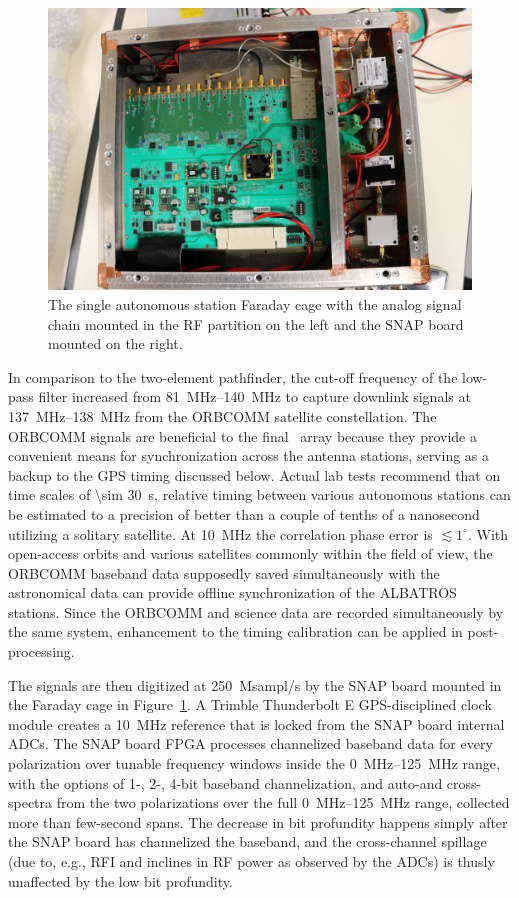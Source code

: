 \begin{figure}
	\centering
	\includegraphics[width=\linewidth]{Figures/47882594521_3895effd86_o}
	\caption{The single autonomous station Faraday cage with the analog signal chain mounted in the RF partition on the left and the SNAP board mounted on the right.}
	\label{fig:47882594521_3895effd86_o}
\end{figure}


In comparison to the two-element pathfinder, the cut-off frequency of the low-pass filter increased from \SIrange{81}{140}{\mega\hertz} to capture downlink signals at \SIrange{137}{138}{\mega\hertz} from the ORBCOMM satellite constellation. The ORBCOMM signals are beneficial to the final \albatros\ array because they provide a convenient means for synchronization across the antenna stations, serving as a backup to the GPS timing discussed below. Actual lab tests recommend that on time scales of \SI{\sim 30}{\second}, relative timing between various autonomous stations can be estimated to a precision of better than a couple of tenths of a nanosecond utilizing a solitary satellite. At \SI{10}{\mega\hertz} the correlation phase error is $\lesssim1^\circ$. With open-access orbits and various satellites commonly within the field of view, the ORBCOMM baseband data supposedly saved simultaneously with the astronomical data can provide offline synchronization of the ALBATROS stations. Since the ORBCOMM and science data are recorded simultaneously by the same system, enhancement to the timing calibration can be applied in post-processing.

The signals are then digitized at \SI{250}{Msampl/s} by the SNAP board mounted in the Faraday cage in Figure~\ref{fig:47882594521_3895effd86_o}. A Trimble Thunderbolt E GPS-disciplined clock module creates a \SI{10}{\mega\hertz} reference that is locked from the SNAP board internal ADCs. The SNAP board FPGA processes channelized baseband data for every polarization over tunable frequency windows inside the \SIrange{0}{125}{\mega\hertz} range, with the options of 1-, 2-, 4-bit baseband channelization, and auto-and cross-spectra from the two polarizations over the full \SIrange{0}{125}{\mega\hertz} range, collected more than few-second spans. The decrease in bit profundity happens simply after the SNAP board has channelized the baseband, and the cross-channel spillage (due to, e.g., RFI and inclines in RF power as observed by the ADCs) is thusly unaffected by the low bit profundity. 

